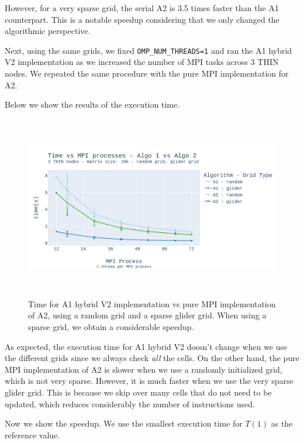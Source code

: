 \documentclass{report}
\begin{document}
However, for a very sparse grid, the serial A2 is 
3.5 times faster than the A1 counterpart. This is a notable speedup 
considering that we only changed the algorithmic perspective. 

Next, using the same grids, we fixed \texttt{OMP\_NUM\_THREADS=1} and ran the 
A1 hybrid V2 implementation as we increased the number of MPI tasks across 3 THIN 
nodes. We repeated the same procedure with the pure MPI implementation for 
A2.

Below we show the results of the execution time.

\begin{figure}[H]
\centering
\includegraphics[width=14cm, height=8cm]{./images/a1_v_a2_static_grid_010k.pdf}
\caption{\label{fig:strongmpiepychybrid} Time for A1 hybrid V2 implementation 
vs pure MPI implementation of A2, using a random grid and a sparse glider grid. When 
using a sparse grid, we obtain a considerable speedup.}
\end{figure}

As expected, the execution time for A1 hybrid V2 doesn't change when we use the 
different grids since we always check \textit{all} the cells.
On the other hand, the pure MPI implementation of A2 is slower when we use a 
randomly initialized grid, which is not very sparse. However, it is much faster
when we use the very sparse glider grid. This is because we skip over many 
cells that do not need to be updated, which reduces considerably the number of 
instructions used.

Now we show the speedup. We use the smallest execution time for $T(1)$ as the 
reference value.
\end{document}
